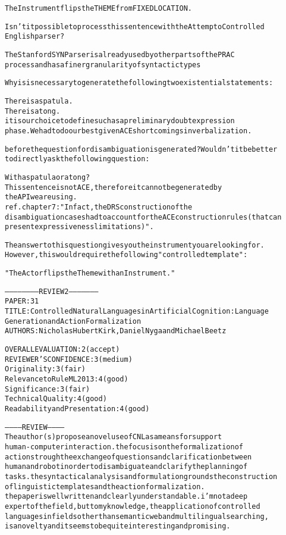 \documentclass[oribibl]{llncs}
\newcommand{\comment}[1]{{\color{red} #1}}
\begin{document}
\begin{alltt}
   The Instrument flips the THEME from FIXEDLOCATION.

Isn't it possible to process this sentence with the Attempto Controlled 
English parser?

\comment{The Stanford SYN Parser is already used by other parts of the PRAC
 process and has a finer granularity of syntactic types}

Why is is necessary to generate the following two existential statements:

   There is a spatula.
   There is a tong.
\comment{it is our choice to define such as a preliminary doubt expression
 phase. We had to do our best given ACE shortcomings in verbalization.}

before the question for disambiguation is generated? Wouldn't it be better
 to directly ask the following question:

   With a spatula or a tong?
\comment{This sentence is not ACE, therefore it cannot be generated by
 the API we are using.}
\comment{ref. chapter 7: "In fact, the DRS construction of the
disambiguation cases had to account for the ACE construction rules (that can
present expressiveness limitations)".}

The answer to this question gives you the instrument you are looking for. 
However, this would require the following "controlled template":

   "The Actor flips the Theme with an Instrument."


----------------------- REVIEW 2 ---------------------
PAPER: 31
TITLE: Controlled Natural Languages in Artificial Cognition: Language 
Generation and Action Formalization
AUTHORS: Nicholas Hubert Kirk, Daniel Nyga and Michael Beetz

OVERALL EVALUATION: 2 (accept)
REVIEWER'S CONFIDENCE: 3 (medium)
Originality: 3 (fair)
Relevance to RuleML 2013: 4 (good)
Significance: 3 (fair)
Technical Quality: 4 (good)
Readability and Presentation: 4 (good)

----------- REVIEW -----------
The author(s) propose a novel use of CNL as a means for support 
human-computer interaction. the focus is on the formalization of 
actions trough the exchange of questions and clarification between 
human and robot in order to disambiguate and clarify the planning of 
tasks. the syntactical analysis and formulation grounds the construction
 of linguistic templates and the action formalization.
the paper is well written and clearly understandable. i'm not a deep 
expert of the field, but to my knowledge, the  application  of controlled 
languages in fields other than semantic web and multilingual searching, 
is a novelty and it seems to be quite interesting and promising.



\end{alltt}
\end{document}

